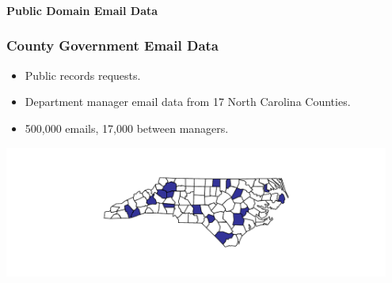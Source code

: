 \documentclass[xcolor={table}, fleqn]{beamer}
\begin{document}
\begin{frame}\frametitle{}
	\begin{center}
		\Huge\textbf{Public Domain Email Data}
	\end{center}
\end{frame}

\begin{frame}\frametitle{County Government Email Data}
	\Large
	\begin{itemize}
		\item Public records requests.
		\vspace*{.1in}
		\item Department manager email data from 17 North Carolina Counties.
		\vspace*{.1in}
		\item 500,000 emails, 17,000 between managers.
		\vspace*{.1in}
	\end{itemize}
	\centering
	\includegraphics[width=0.95\textwidth]{images/County_Map.pdf}
\end{frame}
\end{document}

